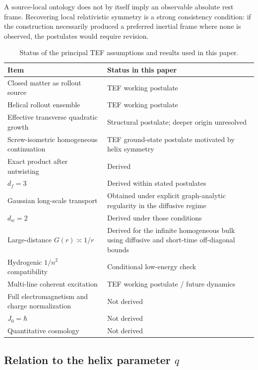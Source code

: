 \documentclass[11pt]{article}
\begin{document}
A source-local ontology does not by itself imply an observable absolute rest frame. Recovering local relativistic symmetry is a strong consistency condition: if the construction necessarily produced a preferred inertial frame where none is observed, the postulates would require revision.

\begin{table}[!t]
\centering
\small
\begin{tabular}{p{}p{}}
\toprule
\textbf{Item} & \textbf{Status in this paper}\\
\midrule
Closed matter as rollout source & TEF working postulate\\
Helical rollout ensemble & TEF working postulate\\
Effective transverse quadratic growth & Structural postulate; deeper origin unresolved\\
Screw-isometric homogeneous continuation & TEF ground-state postulate motivated by helix symmetry\\
Exact product after untwisting & Derived\\
\(d_f=3\) & Derived within stated postulates\\
Gaussian long-scale transport & Obtained under explicit graph-analytic regularity in the diffusive regime\\
\(d_w=2\) & Derived under those conditions\\
Large-distance \(G(r)\asymp1/r\) & Derived for the infinite homogeneous bulk using diffusive and short-time off-diagonal bounds\\
Hydrogenic \(1/n^2\) compatibility & Conditional low-energy check\\
Multi-line coherent excitation & TEF working postulate / future dynamics\\
Full electromagnetism and charge normalization & Not derived\\
\(J_0=\hbar\) & Not derived\\
Quantitative cosmology & Not derived\\
\bottomrule
\end{tabular}
\caption{Status of the principal TEF assumptions and results used in this paper.}
\label{tab:status}
\end{table}

\subsection{Relation to the helix parameter \(q\)}
\end{document}
